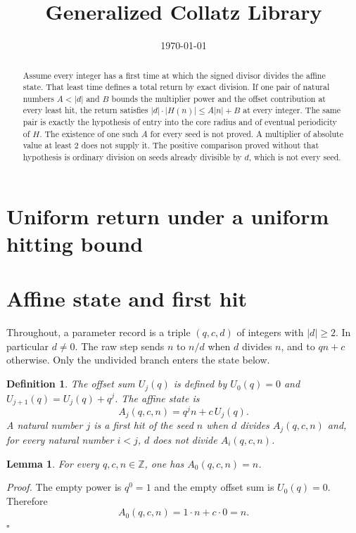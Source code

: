 \documentclass[11pt,letterpaper]{article}
\title{Generalized Collatz Library}
\author{}
\date{\today}
\newcommand{\Z}{\mathbb{Z}}
\newtheorem{lemma}[theorem]{Lemma}
\newtheorem{definition}[theorem]{Definition}
\newenvironment{proof}{\noindent\textit{Proof.}}{\hfill\(\square\)}
\begin{document}
\maketitle
\section*{Uniform return under a uniform hitting bound}

\begin{abstract}
Assume every integer has a first time at which the signed divisor divides the affine state. That least time defines a total return by exact division. If one pair of natural numbers \(A<\lvert d\rvert\) and \(B\) bounds the multiplier power and the offset contribution at every least hit, the return satisfies \(\lvert d\rvert\cdot\lvert H(n)\rvert\le A\lvert n\rvert+B\) at every integer. The same pair is exactly the hypothesis of entry into the core radius and of eventual periodicity of \(H\). The existence of one such \(A\) for every seed is not proved. A multiplier of absolute value at least \(2\) does not supply it. The positive comparison proved without that hypothesis is ordinary division on seeds already divisible by \(d\), which is not every seed.
\end{abstract}

\section{Affine state and first hit}

Throughout, a parameter record is a triple \((q,c,d)\) of integers with \(\lvert d\rvert\ge 2\). In particular \(d\neq 0\). The raw step sends \(n\) to \(n/d\) when \(d\) divides \(n\), and to \(qn+c\) otherwise. Only the undivided branch enters the state below.

\begin{definition}
The offset sum \(U_j(q)\) is defined by \(U_0(q)=0\) and \(U_{j+1}(q)=U_j(q)+q^j\). The affine state is
\[
A_j(q,c,n)=q^j n+c\,U_j(q).
\]
A natural number \(j\) is a first hit of the seed \(n\) when \(d\) divides \(A_j(q,c,n)\) and, for every natural number \(i<j\), \(d\) does not divide \(A_i(q,c,n)\).
\end{definition}

\begin{lemma}
\label{lem:state-zero}
For every \(q,c,n\in\Z\), one has \(A_0(q,c,n)=n\).
\end{lemma}

\begin{proof}
The empty power is \(q^0=1\) and the empty offset sum is \(U_0(q)=0\). Therefore
\[
A_0(q,c,n)=1\cdot n+c\cdot 0=n.
\]
\end{proof}
\end{document}
